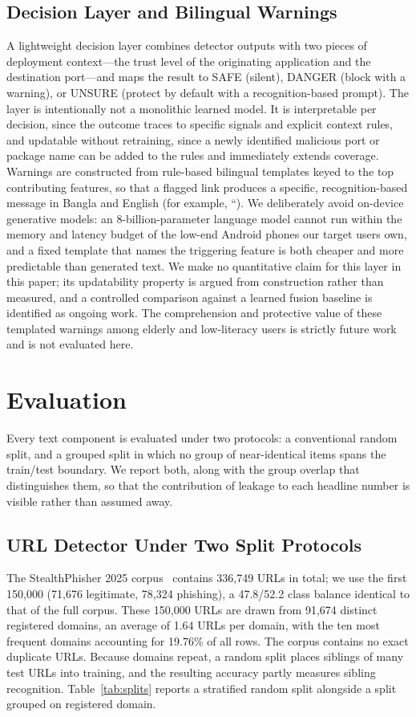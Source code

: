 \documentclass[preprint,12pt,number]{elsarticle}
\begin{document}
\subsection{Decision Layer and Bilingual Warnings}
A lightweight decision layer combines detector outputs with two pieces of deployment context---the trust level of the originating application and the destination port---and maps the result to SAFE (silent), DANGER (block with a warning), or UNSURE (protect by default with a recognition-based prompt). The layer is intentionally not a monolithic learned model. It is interpretable per decision, since the outcome traces to specific signals and explicit context rules, and updatable without retraining, since a newly identified malicious port or package name can be added to the rules and immediately extends coverage. Warnings are constructed from rule-based bilingual templates keyed to the top contributing features, so that a flagged link produces a specific, recognition-based message in Bangla and English (for example, ``). We deliberately avoid on-device generative models: an 8-billion-parameter language model cannot run within the memory and latency budget of the low-end Android phones our target users own, and a fixed template that names the triggering feature is both cheaper and more predictable than generated text. We make no quantitative claim for this layer in this paper; its updatability property is argued from construction rather than measured, and a controlled comparison against a learned fusion baseline is identified as ongoing work. The comprehension and protective value of these templated warnings among elderly and low-literacy users is strictly future work and is not evaluated here.

\section{Evaluation}
Every text component is evaluated under two protocols: a conventional random split, and a grouped split in which no group of near-identical items spans the train/test boundary. We report both, along with the group overlap that distinguishes them, so that the contribution of leakage to each headline number is visible rather than assumed away.

\subsection{URL Detector Under Two Split Protocols}
The StealthPhisher 2025 corpus~\cite{stealthphisher} contains 336{,}749 URLs in total; we use the first 150{,}000 (71{,}676 legitimate, 78{,}324 phishing), a 47.8/52.2 class balance identical to that of the full corpus. These 150{,}000 URLs are drawn from 91{,}674 distinct registered domains, an average of 1.64 URLs per domain, with the ten most frequent domains accounting for 19.76\% of all rows. The corpus contains no exact duplicate URLs. Because domains repeat, a random split places siblings of many test URLs into training, and the resulting accuracy partly measures sibling recognition. Table~\ref{tab:splits} reports a stratified random split alongside a split grouped on registered domain.
\end{document}
